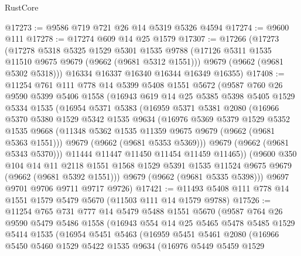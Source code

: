 \begin{lexlean}{RustCore}
\begin{coremodule}
@17273 := @9586 @719 @721 @26 @14 @5319 @5326 @4594
@17274 := @9600 @111
@17278 := @17274 @609 @14 @25 @1579
@17307 := @17266
    (@17273
      (@17278
        @5318
        @5325
        @1529
        @5301
        @1535
        @9788
        (@17126 @5311 @1535 @11510 @9675 @9679 (@9662 (@9681 @5312 @1551)))
        @9679
        (@9662 (@9681 @5302 @5318)))
      @16334
      @16337
      @16340
      @16344
      @16349
      @16355)
@17408 := @11254
    @761
    @111
    @778
    @14
    @5399
    @5408
    @1551
    @5672
    (@9587
      @760
      @26
      @9590
      @5399
      @5406
      @1558
      (@16943
        @619
        @14
        @25
        @5385
        @5398
        @5405
        @1529
        @5334
        @1535
        (@16954
          @5371
          @5383
          (@16959
            @5371
            @5381
            @2080
            (@16966
              @5370
              @5380
              @1529
              @5342
              @1535
              @9634
              (@16976
                @5369
                @5379
                @1529
                @5352
                @1535
                @9668
                (@11348 @5362 @1535 @11359 @9675 @9679 (@9662 (@9681 @5363 @1551)))
                @9679
                (@9662 (@9681 @5353 @5369)))
              @9679
              (@9662 (@9681 @5343 @5370)))
            @11444
            @11447
            @11450
            @11454
            @11459
            @11465))
        (@9600
          @350
          @104
          @14
          @11
          @2118
          @1551
          @1568
          @1529
          @5391
          @1535
          @11524
          @9675
          @9679
          (@9662 (@9681 @5392 @1551)))
        @9679
        (@9662 (@9681 @5335 @5398)))
      @9697
      @9701
      @9706
      @9711
      @9717
      @9726)
@17421 := @11493 @5408 @111 @778 @14 @1551 @1579 @5479 @5670 (@11503 @111 @14 @1579 @9788)
@17526 := @11254
    @765
    @731
    @777
    @14
    @5479
    @5488
    @1551
    @5670
    (@9587
      @764
      @26
      @9590
      @5479
      @5486
      @1558
      (@16943
        @554
        @14
        @25
        @5465
        @5478
        @5485
        @1529
        @5414
        @1535
        (@16954
          @5451
          @5463
          (@16959
            @5451
            @5461
            @2080
            (@16966
              @5450
              @5460
              @1529
              @5422
              @1535
              @9634
              (@16976
                @5449
                @5459
                @1529

\end{coremodule}
\end{lexlean}
